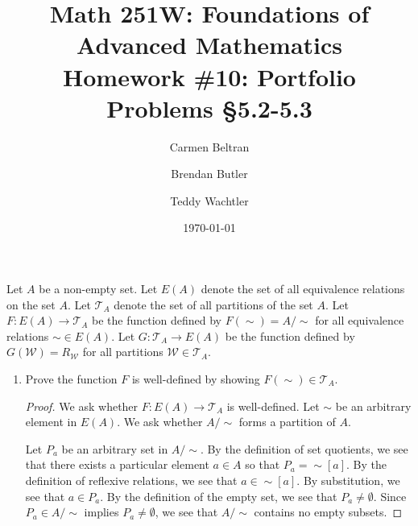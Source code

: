 \documentclass{amsart}
\newcommand{\W}{\mathcal{W}}
\newcommand{\T}{\mathcal{T}}
\numberwithin{equation}{section}
\begin{document}
	\title[Math 251W: Homework \#10]{
		Math 251W: Foundations of Advanced Mathematics \\
		\textmd{Homework \#10: Portfolio Problems \S 5.2-5.3}}
	\author{Carmen Beltran \and Brendan Butler \and Teddy Wachtler}
	\date{\today}

	\maketitle

	\begin{problem}[manual-num=56]
		Let $A$ be a non-empty set.
		Let $E(A)$ denote the set of all equivalence relations on the set $A$.
		Let $\T_A$ denote the set of all partitions of the set $A$.
		Let $F: E(A) \rightarrow \T_A$ be the function defined by $F(\sim) = A / \sim$ for all equivalence relations $\sim \in E(A)$.
		Let $G : \T_A \rightarrow E(A)$ be the function defined by $G(\W) = R_\W$ for all partitions $\W \in \T_A$.

		\begin{enumerate}
			\item
			Prove the function $F$ is well-defined by showing $F(\sim) \in \T_A$.

			\begin{proof}
				We ask whether $F : E(A) \rightarrow \T_A$ is well-defined.
				Let $\sim$ be an arbitrary element in $E(A)$.
				We ask whether $A / \sim$ forms a partition of $A$.

				Let $P_a$ be an arbitrary set in $A / \sim$.
				By the definition of set quotients, we see that there exists a particular element $a \in A$ so that $P_a = \sim [a]$.
				By the definition of reflexive relations, we see that $a \in \sim[a]$.
				By substitution, we see that $a \in P_a$.
				By the definition of the empty set, we see that $P_a \neq \emptyset$.
				Since $P_a \in A / \sim$ implies $P_a \neq \emptyset$, we see that $A / \sim$ contains no empty subsets.


\end{proof}
\end{enumerate}
\end{problem}
\end{document}
